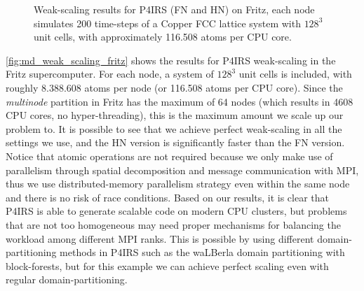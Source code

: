 \documentclass[preprint,12pt]{elsarticle}
\begin{document}
\begin{figure}[t]
\centering
{}
\vspace{-3ex}
\caption{Weak-scaling results for P4IRS (FN and HN) on Fritz, each node simulates 200 time-steps of a Copper FCC lattice system with $128^3$ unit cells, with approximately 116.508 atoms per CPU core.}
\vspace{-2ex}
\label{fig:md_weak_scaling_fritz}
\end{figure}

\autoref{fig:md_weak_scaling_fritz} shows the results for P4IRS weak-scaling in the Fritz supercomputer.
For each node, a system of $128^3$ unit cells is included, with roughly 8.388.608 atoms per node (or 116.508 atoms per CPU core).
Since the \emph{multinode} partition in Fritz has the maximum of 64 nodes (which results in 4608 CPU cores, no hyper-threading), this is the maximum amount we scale up our problem to.
It is possible to see that we achieve perfect weak-scaling in all the settings we use, and the \ac{HN} version is significantly faster than the \ac{FN} version.
Notice that atomic operations are not required because we only make use of parallelism through spatial decomposition and message communication with MPI, thus we use distributed-memory parallelism strategy even within the same node and there is no risk of race conditions.
Based on our results, it is clear that P4IRS is able to generate scalable code on modern CPU clusters, but problems that are not too homogeneous may need proper mechanisms for balancing the workload among different MPI ranks.
This is possible by using different domain-partitioning methods in P4IRS such as the waLBerla domain partitioning with block-forests, but for this example we can achieve perfect scaling even with regular domain-partitioning.
\end{document}
